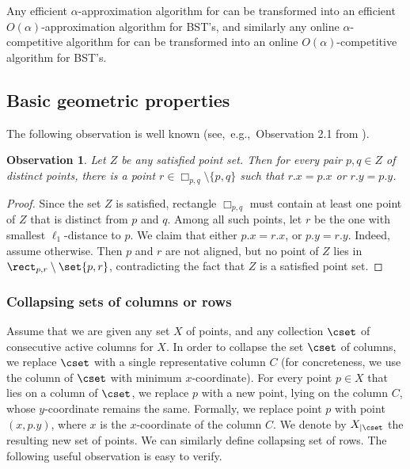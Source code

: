 \documentclass{toc}
\newtheorem{myobs}[theorem]{Observation}
\begin{document}
%
\begin{theorem}[Demaine et al.]    %
Any efficient $\alpha$-approximation algorithm for \minsat can be transformed into an efficient $O(\alpha)$-approximation algorithm for BST's, and similarly any online $\alpha$-competitive algorithm for \minsat can be transformed into an online $O(\alpha)$-competitive algorithm for BST's. 
\end{theorem} 

%






	\subsection{Basic geometric properties }

	The following observation is well known (see,~e.g.,~Observation 2.1 from \cite{DHIKP09}). 
\begin{myobs}
        \label{obs: aligned point} 
        Let $Z$ be  any satisfied point set. Then for every pair $p,q \in Z$ of distinct points, there is a point $r \in \Box_{p,q} \setminus \{p,q\}$ such that $r.x = p.x$ or $r.y = p.y$. 
\end{myobs}
\begin{proof}
Since the set $Z$ is satisfied, rectangle $\Box_{p,q} $ must contain at least one point of $Z$ that is distinct from $p$ and $q$. Among all such points, let $r$ be the one with smallest $\ell_1$-distance to $p$. We claim that either $p.x=r.x$, or $p.y=r.y$. Indeed, assume otherwise. Then $p$ and $r$ are not aligned, but no point of $Z$ lies in $\rect_{p,r}\setminus\set{p,r}$, contradicting the fact that $Z$ is a satisfied point set.
\end{proof}



\subsubsection{Collapsing sets of columns or rows}
Assume that we are given any set $X$ of points, and any collection $\cset$ of consecutive active columns for $X$. 
In order to collapse the set $\cset$ of columns, we replace $\cset$ with a single representative column $C$ (for concreteness, we use the column of $\cset$ with minimum $x$-coordinate). 
For every point $p\in X$ that lies on a column of $\cset$, we replace $p$ with a new point, lying on the column $C$, whose $y$-coordinate remains the same.
Formally, we replace point $p$ with point $(x, p.y)$, where $x$ is the $x$-coordinate of the column $C$.  
We denote by $X_{|\cset}$ the resulting new set of points. We can similarly define collapsing set of rows. The following useful observation is easy to verify.%
\end{document}
